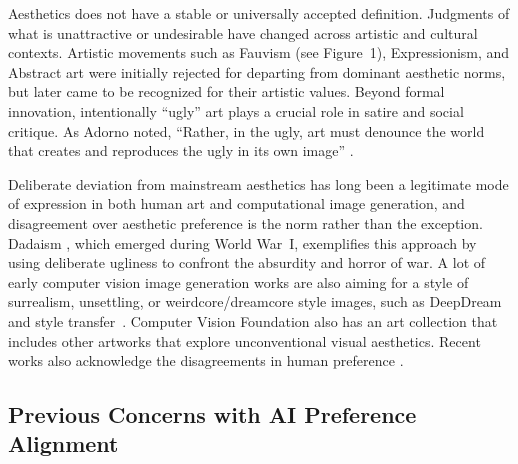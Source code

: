 Aesthetics does not have a stable or universally accepted definition. Judgments of what is unattractive or undesirable have changed across artistic and cultural contexts. Artistic movements such as Fauvism (see Figure~1), Expressionism, and Abstract art were initially rejected for departing from dominant aesthetic norms, but later came to be recognized for their artistic values. Beyond formal innovation, intentionally ``ugly'' art plays a crucial role in satire and social critique. As Adorno noted, ``Rather, in the ugly, art must denounce the world that creates and reproduces the ugly in its own image'' \cite{sartwell_beauty_2024, adorno_aesthetic_1984}. 

Deliberate deviation from mainstream aesthetics has long been a legitimate mode of expression in both human art and computational image generation, and disagreement over aesthetic preference is the norm rather than the exception. Dadaism \cite{noauthor_dada_nodate}, which emerged during World War~I, exemplifies this approach by using deliberate ugliness to confront the absurdity and horror of war. A lot of early computer vision image generation works are also aiming for a style of surrealism, unsettling, or weirdcore/dreamcore style images, such as DeepDream~\cite{noauthor_inceptionism_nodate} and style transfer~\cite{gatys_neural_2015, noauthor_aigc_2024}. Computer Vision Foundation also has an art collection that includes other artworks that explore unconventional visual aesthetics. Recent works also acknowledge the disagreements in human preference \cite{peng_designpref_2025, ren_personalized_2017}.


\subsection{Previous Concerns with AI Preference Alignment}

